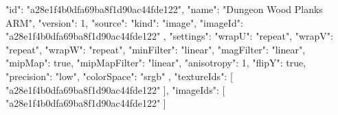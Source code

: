 {
  "id": "a28e1f4b0dfa69ba8f1d90ac44fde122",
  "name": "Dungeon Wood Planks ARM",
  "version": 1,
  "source": {
    "kind": "image",
    "imageId": "a28e1f4b0dfa69ba8f1d90ac44fde122"
  },
  "settings": {
    "wrapU": "repeat",
    "wrapV": "repeat",
    "wrapW": "repeat",
    "minFilter": "linear",
    "magFilter": "linear",
    "mipMap": true,
    "mipMapFilter": "linear",
    "anisotropy": 1,
    "flipY": true,
    "precision": "low",
    "colorSpace": "srgb"
  },
  "textureIds": [
    "a28e1f4b0dfa69ba8f1d90ac44fde122"
  ],
  "imageIds": [
    "a28e1f4b0dfa69ba8f1d90ac44fde122"
  ]
}
